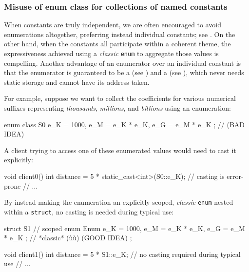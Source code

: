 \subsubsection[Misuse of \lstinline!enum! \lstinline!class! for collections of named constants]{Misuse of {\SubsubsecCode enum} {\SubsubsecCode class} for collections of named constants}\label{misuse-of-enum-class-for-collections-of-named-constants}

When constants are truly independent, we are often encouraged to avoid
enumerations altogether, preferring instead individual constants; see . 
On the other hand, when the constants all participate within a coherent
theme, the expressiveness achieved using a \emph{classic} \lstinline!enum!
to aggregate those values is compelling. Another
advantage of an enumerator over an individual constant is that the
enumerator is guaranteed to be a  (see )
  and a  (see ), 
  which never needs static storage
  and cannot have its address taken.

For example, suppose we want to collect the coefficients for various
numerical suffixes representing \emph{thousands}, \emph{millions}, and
\emph{billions} using an enumeration:

\begin{emcppslisting}[emcppsbatch=e13]
enum class S0 { e_K = 1000, e_M = e_K * e_K, e_G = e_M * e_K };  // (BAD IDEA)
\end{emcppslisting}

\noindent A client trying to access one of these enumerated values would need to
cast it explicitly:

\begin{emcppslisting}[emcppsbatch=e13]
void client0()
{
    int distance = 5 * static_cast<int>(S0::e_K);  // casting is error-prone
    // ...
}
\end{emcppslisting}

\noindent By instead making the enumeration an explicitly scoped, \emph{classic}
\lstinline!enum! nested within a \lstinline!struct!, no casting is needed
during typical use:

\begin{emcppslisting}
struct S1  // scoped
{
    enum Enum { e_K = 1000, e_M = e_K * e_K, e_G = e_M * e_K };
        // *classic* (ù{}ù) (GOOD IDEA)
};

void client1()
{
    int distance = 5 * S1::e_K;  // no casting required during typical use
    // ...
}
\end{emcppslisting}

